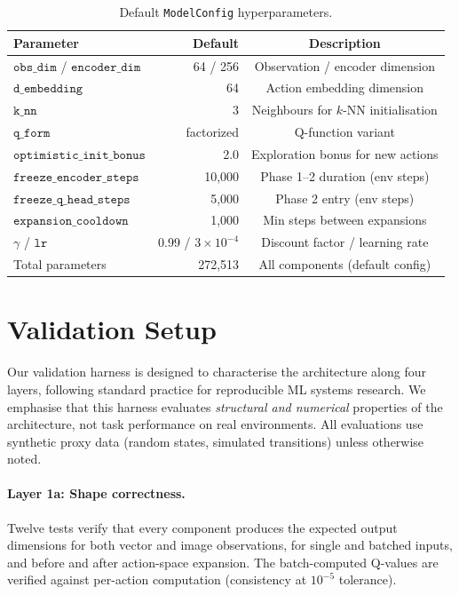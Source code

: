 \documentclass{article}
\begin{document}
\begin{table}[h]
  \centering
  \caption{Default \texttt{ModelConfig} hyperparameters.}
  \label{tab:config}
  \begin{tabular}{lrc}
    \toprule
    \textbf{Parameter} & \textbf{Default} & \textbf{Description} \\
    \midrule
    $\texttt{obs\_dim}$ / $\texttt{encoder\_dim}$ & 64 / 256 & Observation / encoder dimension \\
    $\texttt{d\_embedding}$ & 64 & Action embedding dimension \\
    $\texttt{k\_nn}$ & 3 & Neighbours for $k$-NN initialisation \\
    $\texttt{q\_form}$ & factorized & Q-function variant \\
    $\texttt{optimistic\_init\_bonus}$ & 2.0 & Exploration bonus for new actions \\
    $\texttt{freeze\_encoder\_steps}$ & 10{,}000 & Phase 1--2 duration (env steps) \\
    $\texttt{freeze\_q\_head\_steps}$ & 5{,}000 & Phase 2 entry (env steps) \\
    $\texttt{expansion\_cooldown}$ & 1{,}000 & Min steps between expansions \\
    $\gamma$ / $\texttt{lr}$ & 0.99 / $3\times10^{-4}$ & Discount factor / learning rate \\
    Total parameters & 272{,}513 & All components (default config) \\
    \bottomrule
  \end{tabular}
\end{table}


\section{Validation Setup}
\label{sec:setup}

Our validation harness is designed to characterise the architecture along four layers, following standard practice for reproducible ML systems research. We emphasise that this harness evaluates \emph{structural and numerical} properties of the architecture, not task performance on real environments. All evaluations use synthetic proxy data (random states, simulated transitions) unless otherwise noted.

\paragraph{Layer 1a: Shape correctness.} Twelve tests verify that every component produces the expected output dimensions for both vector and image observations, for single and batched inputs, and before and after action-space expansion. The batch-computed Q-values are verified against per-action computation (consistency at $10^{-5}$ tolerance).
\end{document}
